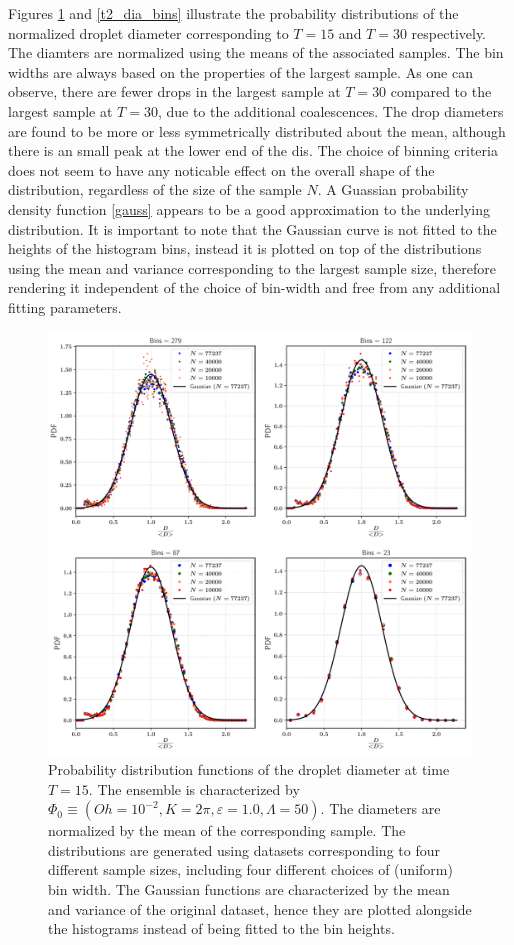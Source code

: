 Figures \ref{t1_dia_bins} and \ref{t2_dia_bins} illustrate the probability distributions
of the normalized droplet diameter corresponding to $T=15$ and $T=30$ respectively. 
The diamters are normalized using the means of the associated samples. 
The bin widths are always based on the properties of the largest sample.
As one can observe, there are fewer drops in the largest sample at $T=30$ 
compared to the largest sample at $T=30$, due to the additional coalescences.  
The drop diameters are found to be more or less symmetrically distributed about the mean,
although there is an small peak at the lower end of the dis.
The choice of binning criteria does not seem to have any noticable effect on the 
overall shape of the distribution, regardless of the size of the sample $N$.   
A Guassian probability density function \eqref{gauss} appears to be a good 
approximation to the underlying distribution.
It is important to note that the Gaussian curve is not fitted to the heights of the 
histogram bins, instead it is plotted on top of the distributions using the mean and 
variance corresponding to the largest sample size, therefore rendering it independent
of the choice of bin-width and free from any additional fitting parameters.  


\begin{figure}
\centering
\includegraphics{plots/drop_stats/short_time_diameter_bins.pdf}
\caption{Probability distribution functions of the droplet diameter at time $T = 15$. 
The ensemble is characterized by $\Phi_0 \equiv \left( Oh = 10^{-2}, K = 2\pi , \varepsilon = 1.0 , \Lambda = 50 \right)$. 
The diameters are normalized by the mean of the corresponding sample.  
The distributions are generated using datasets corresponding to four different sample sizes, 
including four different choices of (uniform) bin width. 
The Gaussian functions are characterized by the mean and variance of the original dataset, 
hence they are plotted alongside the histograms instead of being fitted to the bin heights.
	}
\label{t1_dia_bins}
\end{figure}

